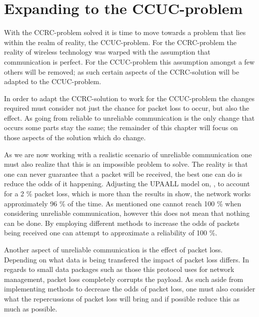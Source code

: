 \chapter{Expanding to the CCUC-problem}\label{CCUC}
With the CCRC-problem solved it is time to move towards a problem that lies within the realm of reality, the CCUC-problem.
For the CCRC-problem the reality of wireless technology was warped with the assumption that communication is perfect.
For the CCUC-problem this assumption amongst a few others will be removed; as such certain aspects of the CCRC-solution will be adapted to the CCUC-problem.

In order to adapt the CCRC-solution to work for the CCUC-problem the changes required must consider not just the chance for packet loss to occur, but also the effect.
As going from reliable to unreliable communication is the only change that occurs some parts stay the same; the remainder of this chapter will focus on those aspects of the solution which do change.

\bigskip \noindent
As we are now working with a realistic scenario of unreliable communication one must also realize that this is an impossible problem to solve.
The reality is that one can never guarantee that a packet will be received, the best one can do is reduce the odds of it happening.
Adjusting the UPAALL model on, \myref{}, to account for a 2 \% packet loss, which is more than the results in  show, the network works approximately 96 \% of the time.
As mentioned one cannot reach 100 \% when considering unreliable communication, however this does not mean that nothing can be done.
By employing different methods to increase the odds of packets being received one can attempt to approximate a reliability of 100 \%.

Another aspect of unreliable communication is the effect of packet loss.
Depending on what data is being transfered the impact of packet loss differs.
In regards to small data packages such as those this protocol uses for network management, packet loss completely corrupts the payload.
As such aside from implementing methods to decrease the odds of packet loss, one must also consider what the repercussions of packet loss will bring and if possible reduce this as much as possible.





